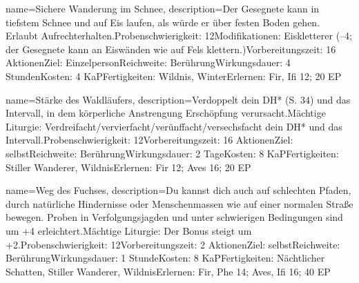 {
    name={Sichere Wanderung im Schnee},
    description={Der Gesegnete kann in tiefstem Schnee und auf Eis laufen, als würde er über festen Boden gehen. Erlaubt Aufrechterhalten.\newline Probenschwierigkeit: 12\newline Modifikationen: Eiskletterer (–4; der Gesegnete kann an Eiswänden wie auf Fels klettern.)\newline Vorbereitungszeit: 16 Aktionen\newline Ziel: Einzelperson\newline Reichweite: Berührung\newline Wirkungsdauer: 4 Stunden\newline Kosten: 4 KaP\newline Fertigkeiten: Wildnis, Winter\newline Erlernen: Fir, Ifi 12; 20 EP}
}


{
    name={Stärke des Waldläufers},
    description={Verdoppelt dein DH* (S. 34) und das Intervall, in dem körperliche Anstrengung Erschöpfung verursacht.\newline Mächtige Liturgie: Verdreifacht/vervierfacht/verünffacht/versechsfacht dein DH* und das Intervall.\newline Probenschwierigkeit: 12\newline Vorbereitungszeit: 16 Aktionen\newline Ziel: selbst\newline Reichweite: Berührung\newline Wirkungsdauer: 2 Tage\newline Kosten: 8 KaP\newline Fertigkeiten: Stiller Wanderer, Wildnis\newline Erlernen: Fir 12; Aves 16; 20 EP}
}


{
    name={Weg des Fuchses},
    description={Du kannst dich auch auf schlechten Pfaden, durch natürliche Hindernisse oder Menschenmassen wie auf einer normalen Straße bewegen. Proben in Verfolgungsjagden und unter schwierigen Bedingungen sind um +4 erleichtert.\newline Mächtige Liturgie: Der Bonus steigt um +2.\newline Probenschwierigkeit: 12\newline Vorbereitungszeit: 2 Aktionen\newline Ziel: selbst\newline Reichweite: Berührung\newline Wirkungsdauer: 1 Stunde\newline Kosten: 8 KaP\newline Fertigkeiten: Nächtlicher Schatten, Stiller Wanderer, Wildnis\newline Erlernen: Fir, Phe 14; Aves, Ifi 16; 40 EP}
}


